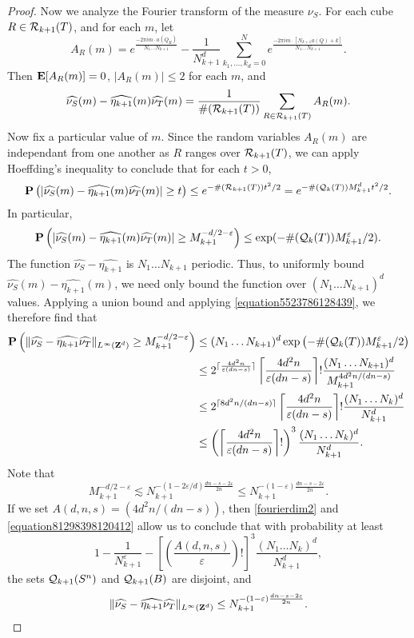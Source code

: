 \begin{proof}
    Now we analyze the Fourier transform of the measure $\nu_S$. For each cube $R \in \operatorname{\mathcal{R}}_{k+1}(T)$, and for each $m$, let
    \[ A_R(m) = e^{\frac{-2 \pi i m \cdot a(Q_R)}{N_1 \dots N_{k+1}}} - \frac{1}{N_{k+1}^d} \sum_{k_1, \dots, k_d = 0}^N e^{\frac{-2 \pi i m \cdot [N_{k+1} a(Q) + k]}{N_1 \dots N_{k+1}}}. \]
    Then $\operatorname{\mathbf{E}}[A_R(m)] = 0$, $|A_R(m)| \leq 2$ for each $m$, and
    \[ \widehat{\nu_S}(m) - \widehat{\eta_{k+1}}(m) \widehat{\nu_T}(m) = \frac{1}{\#(\operatorname{\mathcal{R}}_{k+1}(T))} \sum_{R \in \operatorname{\mathcal{R}}_{k+1}(T)} A_R(m). \]
    Now fix a particular value of $m$. Since the random variables $A_R(m)$ are independant from one another as $R$ ranges over $\operatorname{\mathcal{R}}_{k+1}(T)$, we can apply Hoeffding's inequality to conclude that for each $t > 0$,
    \[ \operatorname{\mathbf{P}} \left( |\widehat{\nu_S}(m) - \widehat{\eta_{k+1}}(m) \widehat{\nu_T}(m)| \geq t \right) \leq e^{-\#(\operatorname{\mathcal{R}}_{k+1}(T)) t^2/2} = e^{-\#(\operatorname{\mathcal{Q}}_k(T)) M_{k+1}^d t^2/2}. \]
    In particular,
    \[ \operatorname{\mathbf{P}} \left( |\widehat{\nu_S}(m) - \widehat{\eta_{k+1}}(m) \widehat{\nu_T}(m)| \geq M_{k+1}^{-d/2 - \varepsilon} \right) \leq \exp(- \#(\operatorname{\mathcal{Q}}_k(T)) M_{k+1}^\varepsilon / 2 ). \]
    The function $\widehat{\nu_S} - \widehat{\eta_{k+1}}$ is $N_1 \dots N_{k+1}$ periodic. Thus, to uniformly bound $\widehat{\nu_S}(m) - \widehat{\eta_{k+1}}(m)$, we need only bound the function over $(N_1 \dots N_{k+1})^d$ values. Applying a union bound and applying \eqref{equation5523786128439}, we therefore find that
    \begin{equation} \label{equation81298398120412}
    \begin{split}
        \operatorname{\mathbf{P}} \left( \| \widehat{\nu_S} - \widehat{\eta_{k+1}} \widehat{\nu_T} \|_{L^\infty(\operatorname{\mathbf{Z}}^d)} \geq M_{k+1}^{- d/2 - \varepsilon} \right) &\leq (N_1 \dots N_{k+1})^d \exp \left( - \#(\operatorname{\mathcal{Q}}_k(T)) M_{k+1}^\varepsilon / 2 \right)\\
        &\leq 2^{\lceil \frac{4d^2n}{\varepsilon(dn - s)} \rceil} \left\lceil \frac{4d^2n}{\varepsilon(dn-s)} \right\rceil! \frac{(N_1 \dots N_{k+1})^d}{M_{k+1}^{4d^2n/(dn - s)}}\\
        &\leq 2^{\lceil 8d^2n/(dn - s) \rceil} \left\lceil \frac{4d^2n}{\varepsilon(dn-s)} \right\rceil! \frac{(N_1 \dots N_k)^d}{N_{k+1}^d}\\
        &\leq \left( \left\lceil \frac{4d^2n}{\varepsilon(dn-s)} \right\rceil! \right)^3 \frac{(N_1 \dots N_k)^d}{N_{k+1}^d}.
    \end{split}
    \end{equation}
    Note that
    \[ M_{k+1}^{-d/2 - \varepsilon} \lesssim N_{k+1}^{-(1 - 2\varepsilon/d) \frac{dn - s - 2\varepsilon}{2n}} \leq N_{k+1}^{-(1 - \varepsilon) \frac{dn - s - 2\varepsilon}{2n}}. \]
    If we set $A(d,n,s) = (4d^2n/(dn - s))$, then \eqref{fourierdim2} and \eqref{equation81298398120412} allow us to conclude that with probability at least
    \[ 1 - \frac{1}{N_{k+1}^\varepsilon} - \left[ \left( \frac{A(d,n,s)}{\varepsilon} \right)! \right]^3 \frac{(N_1 \dots N_k)^d}{N_{k+1}^d}, \]
    the sets $\operatorname{\mathcal{Q}}_{k+1}(S^n)$ and $\operatorname{\mathcal{Q}}_{k+1}(B)$ are disjoint, and
    \[ \| \widehat{\nu_S} - \widehat{\eta_{k+1}} \widehat{\nu_T} \|_{L^\infty(\operatorname{\mathbf{Z}}^d)} \leq N_{k+1}^{-(1 - \varepsilon) \frac{dn - s - 2\varepsilon}{2n}}. \qedhere \]


\end{proof}
